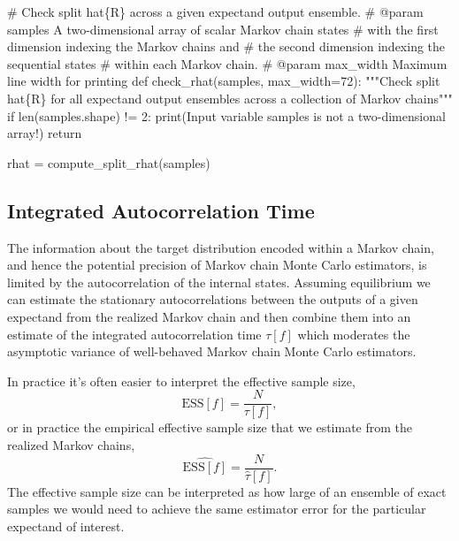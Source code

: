 \documentclass[
  letterpaper,
  DIV=11,
  numbers=noendperiod]{scrartcl}
\newenvironment{Shaded}{\begin{snugshade}}{\end{snugshade}}
\newcommand{\BuiltInTok}[1]{\textcolor[rgb]{0.00,0.23,0.31}{#1}}
\newcommand{\CommentTok}[1]{\textcolor[rgb]{0.37,0.37,0.37}{#1}}
\newcommand{\ControlFlowTok}[1]{\textcolor[rgb]{0.00,0.23,0.31}{#1}}
\newcommand{\DecValTok}[1]{\textcolor[rgb]{0.68,0.00,0.00}{#1}}
\newcommand{\KeywordTok}[1]{\textcolor[rgb]{0.00,0.23,0.31}{#1}}
\newcommand{\NormalTok}[1]{\textcolor[rgb]{0.00,0.23,0.31}{#1}}
\newcommand{\OperatorTok}[1]{\textcolor[rgb]{0.37,0.37,0.37}{#1}}
\newcommand{\StringTok}[1]{\textcolor[rgb]{0.13,0.47,0.30}{#1}}
\begin{document}
\begin{Shaded}
\begin{Highlighting}[]
\CommentTok{\# Check split hat\{R\} across a given expectand output ensemble.}
\CommentTok{\# @param samples A two{-}dimensional array of scalar Markov chain states }
\CommentTok{\#                with the first dimension indexing the Markov chains and }
\CommentTok{\#                the second dimension indexing the sequential states }
\CommentTok{\#                within each Markov chain.}
\CommentTok{\# @param max\_width Maximum line width for printing}
\KeywordTok{def}\NormalTok{ check\_rhat(samples, max\_width}\OperatorTok{=}\DecValTok{72}\NormalTok{):}
  \CommentTok{"""Check split hat\{R\} for all expectand output ensembles across}
\CommentTok{     a collection of Markov chains"""}
  \ControlFlowTok{if} \BuiltInTok{len}\NormalTok{(samples.shape) }\OperatorTok{!=} \DecValTok{2}\NormalTok{:}
    \BuiltInTok{print}\NormalTok{(}\StringTok{\textquotesingle{}Input variable \textasciigrave{}samples\textasciigrave{} is not a two{-}dimensional array!\textquotesingle{}}\NormalTok{)}
    \ControlFlowTok{return}
    
\NormalTok{  rhat }\OperatorTok{=}\NormalTok{ compute\_split\_rhat(samples)}
\end{Highlighting}
\end{Shaded}

\hypertarget{integrated-autocorrelation-time}{%
\subsection{Integrated Autocorrelation
Time}\label{integrated-autocorrelation-time}}

The information about the target distribution encoded within a Markov
chain, and hence the potential precision of Markov chain Monte Carlo
estimators, is limited by the autocorrelation of the internal states.
Assuming equilibrium we can estimate the stationary autocorrelations
between the outputs of a given expectand from the realized Markov chain
and then combine them into an estimate of the integrated autocorrelation
time \(\tau[f]\) which moderates the asymptotic variance of well-behaved
Markov chain Monte Carlo estimators.

In practice it's often easier to interpret the effective sample size, \[
\text{ESS}[f] = \frac{N}{\tau[f]},
\] or in practice the empirical effective sample size that we estimate
from the realized Markov chains, \[
\hat{\text{ESS}[f]} = \frac{N}{\hat{\tau}[f]}.
\] The effective sample size can be interpreted as how large of an
ensemble of exact samples we would need to achieve the same estimator
error for the particular expectand of interest.
\end{document}
